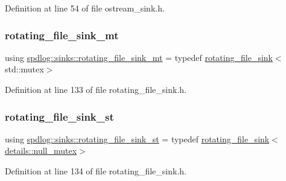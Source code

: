 Definition at line 54 of file ostream\+\_\+sink.\+h.

\mbox{\label{namespacespdlog_1_1sinks_a70b4fab83ca180ef19c4124f4823aeaa}} 
\subsubsection{\texorpdfstring{rotating\+\_\+file\+\_\+sink\+\_\+mt}{rotating\_file\_sink\_mt}}
{\footnotesize\ttfamily using \hyperlink{namespacespdlog_1_1sinks_a70b4fab83ca180ef19c4124f4823aeaa}{spdlog\+::sinks\+::rotating\+\_\+file\+\_\+sink\+\_\+mt} = typedef \hyperlink{classspdlog_1_1sinks_1_1rotating__file__sink}{rotating\+\_\+file\+\_\+sink}$<$std\+::mutex$>$}



Definition at line 133 of file rotating\+\_\+file\+\_\+sink.\+h.

\mbox{\label{namespacespdlog_1_1sinks_a694eff66a11012e2fbe3fa3a1c963c96}} 
\subsubsection{\texorpdfstring{rotating\+\_\+file\+\_\+sink\+\_\+st}{rotating\_file\_sink\_st}}
{\footnotesize\ttfamily using \hyperlink{namespacespdlog_1_1sinks_a694eff66a11012e2fbe3fa3a1c963c96}{spdlog\+::sinks\+::rotating\+\_\+file\+\_\+sink\+\_\+st} = typedef \hyperlink{classspdlog_1_1sinks_1_1rotating__file__sink}{rotating\+\_\+file\+\_\+sink}$<$\hyperlink{structspdlog_1_1details_1_1null__mutex}{details\+::null\+\_\+mutex}$>$}



Definition at line 134 of file rotating\+\_\+file\+\_\+sink.\+h.

\mbox{\label{namespacespdlog_1_1sinks_a58091bb55dd96f7e29ccc044338c054c}} 
